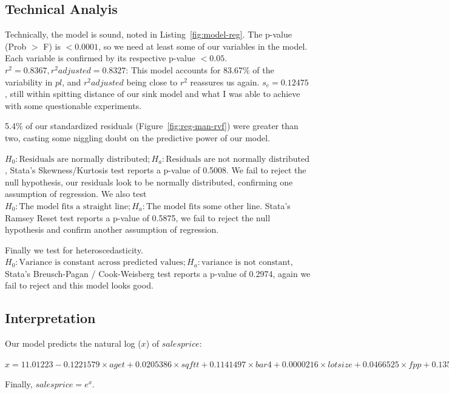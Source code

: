 \documentclass[twocolumn,11pt]{article}
\begin{document}

\subsection{Technical Analyis}
Technically, the model is sound, noted in Listing~\ref{fig:model-reg}.
The p-value (Prob $>$ F) is $<0.0001$, so we need at least some of our variables in the model.
Each variable is confirmed by its respective p-value $<0.05$.
$r^2 = 0.8367, r^2 adjusted = 0.8327$: This model accounts for 83.67\% of the variability in $pl$,
and $r^2 adjusted$ being close to $r^2$ reassures us again.
$s_e = 0.12475$, still within spitting distance of our sink model and what I was
able to achieve with some questionable experiments.

5.4\% of our standardized residuals (Figure~\ref{fig:reg-man-rvf}) were greater than two,
casting some niggling doubt on the predictive power of our model.

$H_0: \text{Residuals are normally distributed}; H_a: \text{Residuals are not normally distributed}$,
Stata's Skewness/Kurtosis test reports a p-value of 0.5008.
We fail to reject the null hypothesis, our residuals look to be normally distributed,
confirming one assumption of regression. We also test $H_0: \text{The model fits a straight line}; H_a: \text{The model fits some other line}$.
Stata's Ramsey Reset test reports a p-value of 0.5875, we fail to reject the null hypothesis
and confirm another assumption of regression.

Finally we test for heteroscedasticity.
$H_0: \text{Variance is constant across predicted values}; H_a: \text{variance is not constant}$,
Stata's Breusch-Pagan / Cook-Weisberg test reports a p-value of 0.2974,
again we fail to reject and this model looks good.


\subsection{Interpretation}
Our model predicts the natural log ($x$) of $salesprice$:

\begin{math}
x = 11.01223 - 0.1221579 \times aget +
0.0205386 \times sqftt +
0.1141497 \times bar4 +
0.0000216 \times lotsize +
0.0466525 \times fpp +
0.1355746 \times garage
\end{math}

Finally, $salesprice = e^x$.
\end{document}
